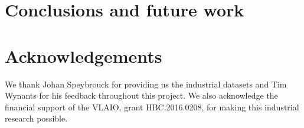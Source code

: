 \documentclass[preprint,12pt]{elsarticle}
\begin{document}
	\section{Conclusions and future work}
	\label{sec:conc}
	
	\section*{Acknowledgements}
	
	We thank Johan Speybrouck for providing us the industrial datasets and Tim Wynants for his feedback throughout this project. We also acknowledge the financial support of the VLAIO, grant HBC.2016.0208, for making this industrial research possible.
	
	
	
	
	
	
	
	
	
	
	
	
\end{document}
